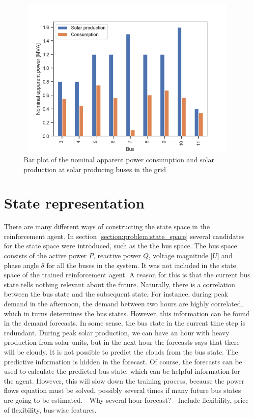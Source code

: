 \documentclass[class=book, crop=false]{standalone}
\begin{document}
\begin{figure}[h]
    \center
\includegraphics[height=8cm, width=12cm]{figures/nominal_sgen.png}
    \caption[size = 9]{Bar plot of the nominal apparent power consumption and solar production at solar producing buses in the grid}
    \label{fig:discussion:nominal_sgen}
\end{figure}




\section{State representation}
There are many different ways of constructing the state space in the reinforcement agent. In section \ref{section:problem:state_space} several candidates for the state space were introduced, such as the the bus space. The bus space consists of the active power $P$, reactive power $Q$, voltage magnitude $|U|$ and phase angle $\delta$ for all the buses in the system. It was not included in the state space of the trained reinforcement agent. A reason for this is that the current bus state tells nothing relevant about the future. Naturally, there is a correlation between the bus state and the subsequent state. For instance, during peak demand in the afternoon, the demand between two hours are highly correlated, which in turns determines the bus states. However, this information can be found in the demand forecasts. In some sense, the bus state in the current time step is redundant. During peak solar production, we can have an hour with heavy production from solar units, but in the next hour the forecasts says that there will be cloudy. It is not possible to predict the clouds from the bus state. The predictive information is hidden in the forecast. Of course, the forecasts can be used to calculate the predicted bus state, which can be helpful information for the agent. However, this will slow down the training process, because the power flows equation must be solved, possibly several times if many future bus states are going to be estimated. 
- Why several hour forecast?
- Include flexibility, price of flexibility, bus-wise features. 
\end{document}
